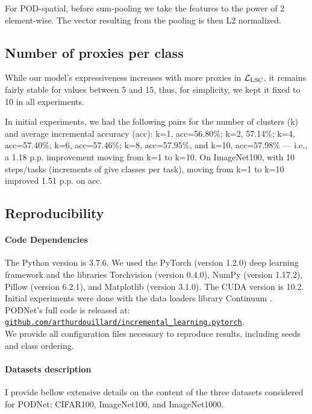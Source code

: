 For POD-spatial, before sum-pooling we take the features to the power of 2 element-wise. The vector
resulting from the pooling is then L2 normalized.

\subsection{Number of proxies per class}

While our model's expressiveness increases with more proxies in $\mathcal{L}_\text{LSC}$, it remains fairly
stable for values between 5 and 15, thus, for simplicity, we kept it fixed to 10 in all experiments.

In initial experiments, we had the following pairs for the number of clusters (k) and average
incremental accuracy (acc): k=1, acc=56.80\%; k=2, 57.14\%; k=4, acc=57.40\%; k=6, acc=57.46\%; k=8,
acc=57.95\%, and k=10, acc=57.98\% --- i.e., a 1.18 p.p. improvement moving from k=1 to k=10. On
ImageNet100, with 10 steps/tasks (increments of give classes per task), moving from k=1 to k=10
improved 1.51 p.p. on acc.

\subsection{Reproducibility}

\paragraph{Code Dependencies} The Python version is  3.7.6. We used the PyTorch
\cite{paszke2017pytorch} (version 1.2.0) deep learning framework and the libraries Torchvision
(version 0.4.0), NumPy \cite{oliphant2006numpy} (version 1.17.2), Pillow (version 6.2.1), and
Matplotlib \cite{hunter2007matplotlib} (version 3.1.0). The CUDA version is 10.2. Initial
experiments were done with the data loaders library Continuum \cite{douillardlesort2020continuum}.
PODNet's full code is released at:\\
\href{https://github.com/arthurdouillard/incremental\_learning.pytorch}{\texttt{github.com/arthurdouillard/incremental\_learning.pytorch}}.
\\We provide all configuration files necessary to reproduce results, including seeds and class
ordering.

\paragraph{Datasets description} I provide bellow extensive details on the content of the three
datasets considered for PODNet: CIFAR100, ImageNet100, and ImageNet1000.

